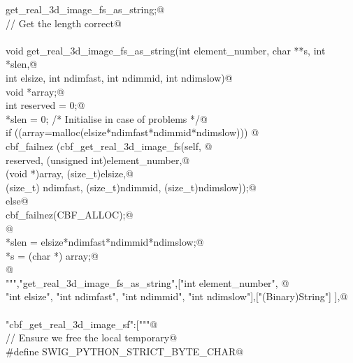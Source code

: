 \documentclass[10pt,a4paper,twoside,notitlepage]{article}
\begin{document}
\begin{flushleft}
\begin{list}{}{}
\mbox{}\verb@       get_real_3d_image_fs_as_string;@\\
\mbox{}\verb@// Get the length correct@\\
\mbox{}\verb@@\\
\mbox{}\verb@    void get_real_3d_image_fs_as_string(int element_number, char **s, int *slen,@\\
\mbox{}\verb@    int elsize, int ndimfast, int ndimmid, int ndimslow){@\\
\mbox{}\verb@        void *array;@\\
\mbox{}\verb@        int reserved = 0;@\\
\mbox{}\verb@        *slen = 0; /* Initialise in case of problems */@\\
\mbox{}\verb@        if ((array=malloc(elsize*ndimfast*ndimmid*ndimslow))) {@\\
\mbox{}\verb@               cbf_failnez (cbf_get_real_3d_image_fs(self, @\\
\mbox{}\verb@               reserved, (unsigned int)element_number,@\\
\mbox{}\verb@               (void *)array, (size_t)elsize,@\\
\mbox{}\verb@               (size_t) ndimfast, (size_t)ndimmid, (size_t)ndimslow));@\\
\mbox{}\verb@         }else{@\\
\mbox{}\verb@               cbf_failnez(CBF_ALLOC);@\\
\mbox{}\verb@         }@\\
\mbox{}\verb@        *slen = elsize*ndimfast*ndimmid*ndimslow;@\\
\mbox{}\verb@        *s = (char *) array;@\\
\mbox{}\verb@      }@\\
\mbox{}\verb@""","get_real_3d_image_fs_as_string",["int element_number", @\\
\mbox{}\verb@    "int elsize", "int ndimfast", "int ndimmid", "int ndimslow"],["(Binary)String"] ],@\\
\mbox{}\verb@@\\
\mbox{}\verb@"cbf_get_real_3d_image_sf":["""@\\
\mbox{}\verb@// Ensure we free the local temporary@\\
\mbox{}\verb@%{@\\
\mbox{}\verb@#define SWIG_PYTHON_STRICT_BYTE_CHAR@\\
\mbox{}\verb@%}@\\
\mbox{}\verb@%cstring_output_allocate_size(char ** s, int *slen, free(*$1))@\\

\end{list}
\end{flushleft}
\end{document}
